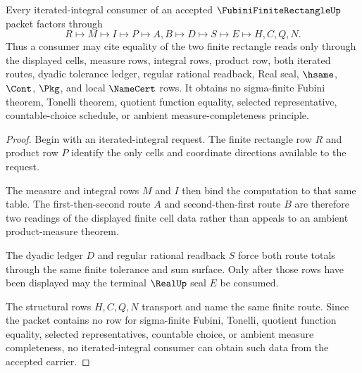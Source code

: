 \begin{theorem}
\label{thm:fubini-finite-rectangle-iterated-integral-nonescape}
Every iterated-integral consumer of an accepted $\FubiniFiniteRectangleUp$ packet factors through
$$
R \longmapsto M \longmapsto I \longmapsto P \longmapsto A,B \longmapsto D \longmapsto S \longmapsto E \longmapsto H,C,Q,N .
$$
Thus a consumer may cite equality of the two finite rectangle reads only through the displayed cells, measure rows, integral rows, product row, both iterated routes, dyadic tolerance ledger, regular rational readback, Real seal, $\hsame$, $\Cont$, $\Pkg$, and local $\NameCert$ rows. It obtains no sigma-finite Fubini theorem, Tonelli theorem, quotient function equality, selected representative, countable-choice schedule, or ambient measure-completeness principle.
\end{theorem}
\begin{proof}
Begin with an iterated-integral request. The finite rectangle row $R$ and product row $P$ identify the only cells and coordinate directions available to the request.

The measure and integral rows $M$ and $I$ then bind the computation to that same table. The first-then-second route $A$ and second-then-first route $B$ are therefore two readings of the displayed finite cell data rather than appeals to an ambient product-measure theorem.

The dyadic ledger $D$ and regular rational readback $S$ force both route totals through the same finite tolerance and sum surface. Only after those rows have been displayed may the terminal $\RealUp$ seal $E$ be consumed.

The structural rows $H,C,Q,N$ transport and name the same finite route. Since the packet contains no row for sigma-finite Fubini, Tonelli, quotient function equality, selected representatives, countable choice, or ambient measure completeness, no iterated-integral consumer can obtain such data from the accepted carrier.
\end{proof}


